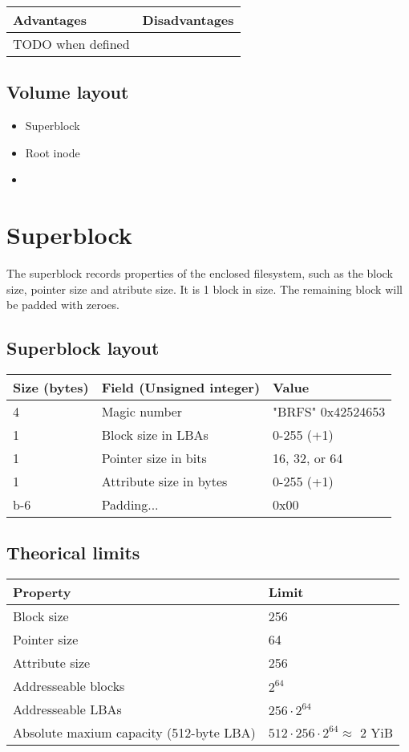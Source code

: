 \documentclass[]{article}
\begin{document}
	\begin{tabularx}{\textwidth}{X|X}
		\textbf{Advantages} & \textbf{Disadvantages} \\
		\hline
		TODO when defined
	\end{tabularx}

	\subsection{Volume layout}
	
	\begin{itemize}
		\item Superblock
		\item Root inode
		\item <other inodes>
	\end{itemize}

	\section{Superblock}
	
	The superblock records properties of the enclosed filesystem, such as the block size, pointer size and atribute size. It is 1 block in size. The remaining block will be padded with zeroes.
	
	\subsection{Superblock layout}
	
	\begin{tabular}{|l|l|l|} 
		\hline
		\textbf{Size (bytes)} & \textbf{Field (Unsigned integer)} & \textbf{Value} \\ [0.5ex] 
		\hline
		4 & Magic number & "BRFS" 0x42524653  \\ 
		\hline
		1 & Block size in LBAs & 0-255 (+1) \\
		\hline
		1 & Pointer size in bits & 16, 32, or 64 \\
		\hline
		1 & Attribute size in bytes & 0-255 (+1) \\
		\hline
		b-6 & Padding... & 0x00 \\
		\hline	
	\end{tabular}

	\subsection{Theorical limits}
	
	\begin{tabular}{|l|l|} 
		\hline
		\textbf{Property} & \textbf{Limit} \\ [0.5ex] 
		\hline
		Block size & 256 \\ 
		\hline
		Pointer size & 64 \\
		\hline
		Attribute size & 256 \\
		\hline
		Addresseable blocks & $2^{64}$ \\
		\hline	
		Addresseable LBAs & $256 \cdot 2^{64}$ \\
		\hline
		Absolute maxium capacity (512-byte LBA) & $512 \cdot 256 \cdot 2^{64} \approx $ 2 YiB \\
		\hline
	\end{tabular}\\
\end{document}
